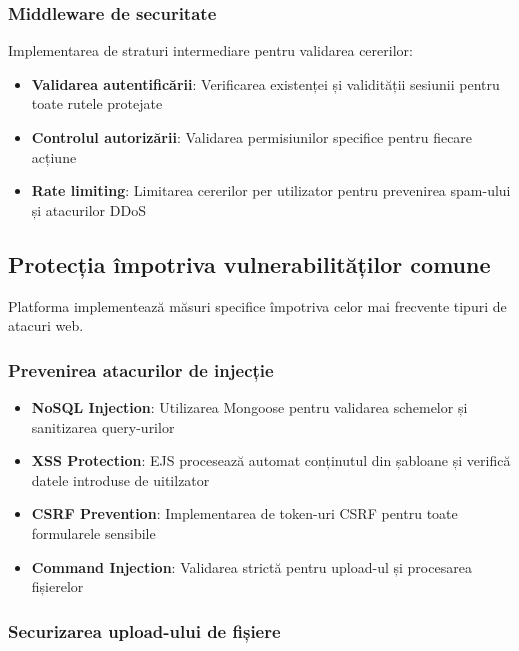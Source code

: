 \documentclass[12pt,a4paper]{report}
\begin{document}
\subsubsection{Middleware de securitate}

Implementarea de straturi intermediare pentru validarea cererilor:

\begin{itemize}
    \item \textbf{Validarea autentificării}: Verificarea existenței și validității sesiunii pentru toate rutele protejate
    \item \textbf{Controlul autorizării}: Validarea permisiunilor specifice pentru fiecare acțiune
    \item \textbf{Rate limiting}: Limitarea cererilor per utilizator pentru prevenirea spam-ului și atacurilor DDoS
\end{itemize}

\subsection{Protecția împotriva vulnerabilităților comune}

Platforma implementează măsuri specifice împotriva celor mai frecvente tipuri de atacuri web.

\subsubsection{Prevenirea atacurilor de injecție}

\begin{itemize}
    \item \textbf{NoSQL Injection}: Utilizarea Mongoose pentru validarea schemelor și sanitizarea query-urilor
    \item \textbf{XSS Protection}: EJS procesează automat conținutul din șabloane și verifică datele introduse de uitilzator
    \item \textbf{CSRF Prevention}: Implementarea de token-uri CSRF pentru toate formularele sensibile
    \item \textbf{Command Injection}: Validarea strictă pentru upload-ul și procesarea fișierelor
\end{itemize}

\subsubsection{Securizarea upload-ului de fișiere}
\end{document}
